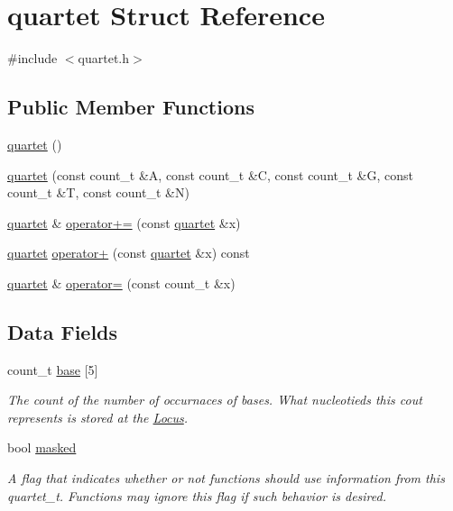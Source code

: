 \hypertarget{structquartet}{\section{quartet Struct Reference}
\label{structquartet}
}


{\ttfamily \#include $<$quartet.\-h$>$}

\subsection*{Public Member Functions}
\begin{DoxyCompactItemize}
\item 
\hyperlink{structquartet_acc7db631c6b1adf534d0512f014477ef}{quartet} ()
\item 
\hyperlink{structquartet_a4e62827f68d59ffaa81ec61ddc979596}{quartet} (const count\-\_\-t \&A, const count\-\_\-t \&C, const count\-\_\-t \&G, const count\-\_\-t \&T, const count\-\_\-t \&N)
\item 
\hyperlink{structquartet}{quartet} \& \hyperlink{structquartet_a6b1bb41bb1851aadb3647afa62bb34ed}{operator+=} (const \hyperlink{structquartet}{quartet} \&x)
\item 
\hyperlink{structquartet}{quartet} \hyperlink{structquartet_af45359481a51a08241411e9aafdbccc5}{operator+} (const \hyperlink{structquartet}{quartet} \&x) const 
\item 
\hyperlink{structquartet}{quartet} \& \hyperlink{structquartet_a028bb3904f94f555cb6349b227da6798}{operator=} (const count\-\_\-t \&x)
\end{DoxyCompactItemize}
\subsection*{Data Fields}
\begin{DoxyCompactItemize}
\item 
\hypertarget{structquartet_ab6231b6ff3dbe82a46c6411c9a56f12e}{count\-\_\-t \hyperlink{structquartet_ab6231b6ff3dbe82a46c6411c9a56f12e}{base} \mbox{[}5\mbox{]}}\label{structquartet_ab6231b6ff3dbe82a46c6411c9a56f12e}

\begin{DoxyCompactList}\small\item\em The count of the number of occurnaces of bases. What nucleotieds this cout represents is stored at the \hyperlink{classLocus}{Locus}. \end{DoxyCompactList}\item 
\hypertarget{structquartet_ab55b5c0ef78a0dabebdc7bec6a1bd053}{bool \hyperlink{structquartet_ab55b5c0ef78a0dabebdc7bec6a1bd053}{masked}}\label{structquartet_ab55b5c0ef78a0dabebdc7bec6a1bd053}

\begin{DoxyCompactList}\small\item\em A flag that indicates whether or not functions should use information from this quartet\-\_\-t. Functions may ignore this flag if such behavior is desired. \end{DoxyCompactList}\end{DoxyCompactItemize}


